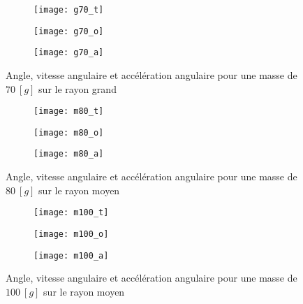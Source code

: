 \begin{figure}[H]
\centering
\begin{subfigure}[t]{.3\linewidth}
\centering
\texttt{[image: g70\_t]}
\end{subfigure}
\begin{subfigure}[t]{.3\linewidth}
\centering
\texttt{[image: g70\_o]}
\end{subfigure}
\begin{subfigure}[t]{.3\linewidth}
\centering
\texttt{[image: g70\_a]}
\end{subfigure}
\caption{Angle, vitesse angulaire et accélération angulaire pour une masse de $70 \ [g]$ sur le rayon grand}
\label{fig:g70}
\end{figure}

\begin{figure}[H]
\centering
\begin{subfigure}[t]{.3\linewidth}
\centering
\texttt{[image: m80\_t]}
\end{subfigure}
\begin{subfigure}[t]{.3\linewidth}
\centering
\texttt{[image: m80\_o]}
\end{subfigure}
\begin{subfigure}[t]{.3\linewidth}
\centering
\texttt{[image: m80\_a]}
\end{subfigure}
\caption{Angle, vitesse angulaire et accélération angulaire pour une masse de $80 \ [g]$ sur le rayon moyen}
\label{fig:m80}
\end{figure}

\begin{figure}[H]
\centering
\begin{subfigure}[t]{.3\linewidth}
\centering
\texttt{[image: m100\_t]}
\end{subfigure}
\begin{subfigure}[t]{.3\linewidth}
\centering
\texttt{[image: m100\_o]}
\end{subfigure}
\begin{subfigure}[t]{.3\linewidth}
\centering
\texttt{[image: m100\_a]}
\end{subfigure}
\caption{Angle, vitesse angulaire et accélération angulaire pour une masse de $100 \ [g]$ sur le rayon moyen}
\label{fig:m100}
\end{figure}

